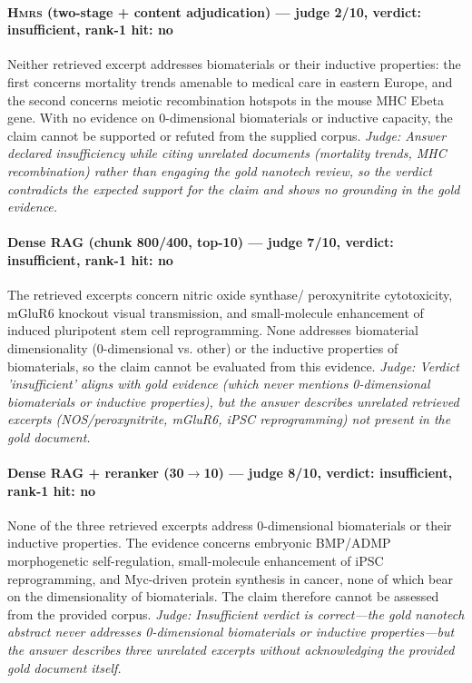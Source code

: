 \documentclass[sigconf, review, anonymous]{acmart}
\begin{document}
\paragraph{\textbf{\textsc{Hmrs}} (two-stage + content adjudication) --- judge 2/10, verdict: insufficient, rank-1 hit: no}
\noindent Neither retrieved excerpt addresses biomaterials or their inductive properties: the first concerns mortality trends amenable to medical care in eastern Europe, and the second concerns meiotic recombination hotspots in the mouse MHC Ebeta gene. With no evidence on 0-dimensional biomaterials or inductive capacity, the claim cannot be supported or refuted from the supplied corpus.
\noindent\small\textit{Judge: Answer declared insufficiency while citing unrelated documents (mortality trends, MHC recombination) rather than engaging the gold nanotech review, so the verdict contradicts the expected support for the claim and shows no grounding in the gold evidence.}
\paragraph{Dense RAG (chunk 800/400, top-10) --- judge 7/10, verdict: insufficient, rank-1 hit: no}
\noindent The retrieved excerpts concern nitric oxide synthase/ peroxynitrite cytotoxicity, mGluR6 knockout visual transmission, and small-molecule enhancement of induced pluripotent stem cell reprogramming. None addresses biomaterial dimensionality (0-dimensional vs. other) or the inductive properties of biomaterials, so the claim cannot be evaluated from this evidence.
\noindent\small\textit{Judge: Verdict 'insufficient' aligns with gold evidence (which never mentions 0-dimensional biomaterials or inductive properties), but the answer describes unrelated retrieved excerpts (NOS/peroxynitrite, mGluR6, iPSC reprogramming) not present in the gold document.}
\paragraph{Dense RAG + reranker (30$\to$10) --- judge 8/10, verdict: insufficient, rank-1 hit: no}
\noindent None of the three retrieved excerpts address 0-dimensional biomaterials or their inductive properties. The evidence concerns embryonic BMP/ADMP morphogenetic self-regulation, small-molecule enhancement of iPSC reprogramming, and Myc-driven protein synthesis in cancer, none of which bear on the dimensionality of biomaterials. The claim therefore cannot be assessed from the provided corpus.
\noindent\small\textit{Judge: Insufficient verdict is correct---the gold nanotech abstract never addresses 0-dimensional biomaterials or inductive properties---but the answer describes three unrelated excerpts without acknowledging the provided gold document itself.}
\end{document}
